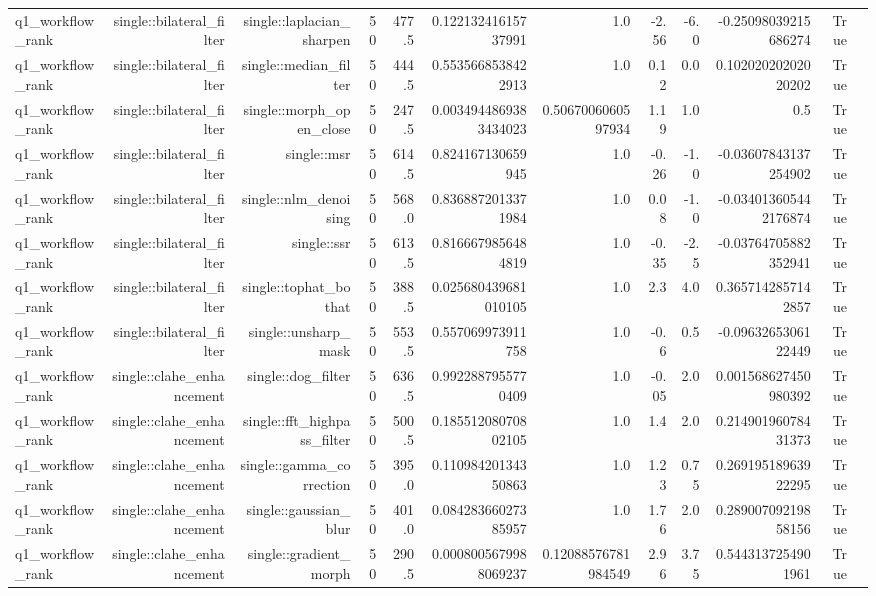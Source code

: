 \begin{tabular}{lrrrrrrrrrrr}
q1\_workflow\_rank & single::bilateral\_filter & single::laplacian\_sharpen & 50 & 477.5 & 0.12213241615737991 & 1.0 & -2.56 & -6.0 & -0.25098039215686274 & True &  \\
q1\_workflow\_rank & single::bilateral\_filter & single::median\_filter & 50 & 444.5 & 0.5535668538422913 & 1.0 & 0.12 & 0.0 & 0.10202020202020202 & True &  \\
q1\_workflow\_rank & single::bilateral\_filter & single::morph\_open\_close & 50 & 247.5 & 0.0034944869383434023 & 0.5067006060597934 & 1.19 & 1.0 & 0.5 & True &  \\
q1\_workflow\_rank & single::bilateral\_filter & single::msr & 50 & 614.5 & 0.824167130659945 & 1.0 & -0.26 & -1.0 & -0.03607843137254902 & True &  \\
q1\_workflow\_rank & single::bilateral\_filter & single::nlm\_denoising & 50 & 568.0 & 0.8368872013371984 & 1.0 & 0.08 & -1.0 & -0.034013605442176874 & True &  \\
q1\_workflow\_rank & single::bilateral\_filter & single::ssr & 50 & 613.5 & 0.8166679856484819 & 1.0 & -0.35 & -2.5 & -0.03764705882352941 & True &  \\
q1\_workflow\_rank & single::bilateral\_filter & single::tophat\_bothat & 50 & 388.5 & 0.025680439681010105 & 1.0 & 2.3 & 4.0 & 0.3657142857142857 & True &  \\
q1\_workflow\_rank & single::bilateral\_filter & single::unsharp\_mask & 50 & 553.5 & 0.557069973911758 & 1.0 & -0.6 & 0.5 & -0.0963265306122449 & True &  \\
q1\_workflow\_rank & single::clahe\_enhancement & single::dog\_filter & 50 & 636.5 & 0.9922887955770409 & 1.0 & -0.05 & 2.0 & 0.001568627450980392 & True &  \\
q1\_workflow\_rank & single::clahe\_enhancement & single::fft\_highpass\_filter & 50 & 500.5 & 0.18551208070802105 & 1.0 & 1.4 & 2.0 & 0.21490196078431373 & True &  \\
q1\_workflow\_rank & single::clahe\_enhancement & single::gamma\_correction & 50 & 395.0 & 0.11098420134350863 & 1.0 & 1.23 & 0.75 & 0.26919518963922295 & True &  \\
q1\_workflow\_rank & single::clahe\_enhancement & single::gaussian\_blur & 50 & 401.0 & 0.08428366027385957 & 1.0 & 1.76 & 2.0 & 0.28900709219858156 & True &  \\
q1\_workflow\_rank & single::clahe\_enhancement & single::gradient\_morph & 50 & 290.5 & 0.0008005679988069237 & 0.12088576781984549 & 2.96 & 3.75 & 0.5443137254901961 & True &  \\

\end{tabular}

